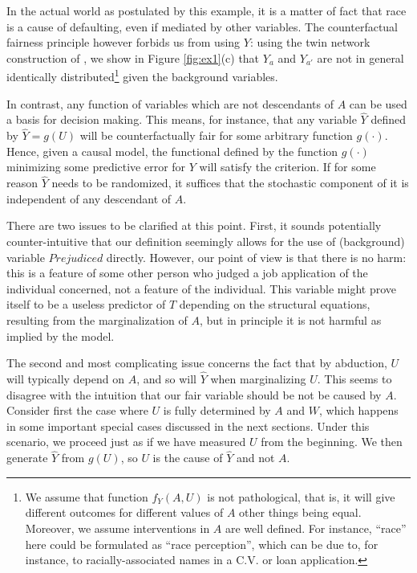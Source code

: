 In the actual world as postulated by this example, it is a matter of
fact that race is a cause of defaulting, even if mediated by other
variables. The counterfactual fairness principle however forbids us
from using $Y$: using the twin network construction of
\citet{pearl:00}, we show in Figure \ref{fig:ex1}(c) that $Y_a$ and
$Y_{a'}$ are not in general identically distributed\footnote{We assume
  that function $f_Y(A, U)$ is not pathological, that is, it will give
  different outcomes for different values of $A$ other things being
  equal. Moreover, we assume interventions in $A$ are well defined.
  For instance, ``race'' here could be formulated as ``race
  perception'', which can be due to, for instance, to
  racially-associated names in a C.V. or loan application.}  given the
background variables.

In contrast, any function of variables which are not descendants of
$A$ can be used a basis for decision making. This means, for instance,
that any variable $\hat Y$ defined by $\hat Y = g(U)$ will be counterfactually
fair for some arbitrary function $g(\cdot)$. Hence, given a causal
model, the functional defined by the function $g(\cdot)$ 
minimizing some predictive error for $Y$ will satisfy the criterion.
If for some reason $\hat Y$ needs to be randomized, it suffices that the
stochastic component of it is independent of any descendant of $A$.

There are two issues to be clarified at this point. First,
it sounds potentially counter-intuitive that our definition
seemingly allows for the use of (background) variable $Prejudiced$
directly. However, our point of view is that there is no harm: this is
a feature of some other person who judged a job application of the
individual concerned, not a feature of the individual. This variable
might prove itself to be a useless predictor of $T$ depending on the
structural equations, resulting from the marginalization of $A$, but
in principle it is not harmful as implied by the model.

The second and most complicating issue concerns the fact that by
abduction, $U$ will typically depend on $A$, and so will $\hat Y$ when
marginalizing $U$. This seems to disagree with the intuition that our
fair variable should be not be caused by $A$. Consider first the case
where $U$ is fully determined by $A$ and $W$, which happens in some
important special cases discussed in the next sections. Under this
scenario, we proceed just as if we have measured $U$ from the
beginning. We then generate $\hat Y$ from $g(U)$, so $U$ is the cause of $\hat
Y$ and not $A$.

